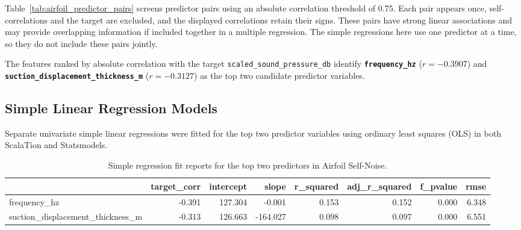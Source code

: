 \documentclass[11pt]{article}
\begin{document}
Table~\ref{tab:airfoil_predictor_pairs} screens predictor pairs using an absolute correlation threshold of 0.75. Each pair appears once, self-correlations and the target are excluded, and the displayed correlations retain their signs. These pairs have strong linear associations and may provide overlapping information if included together in a multiple regression. The simple regressions here use one predictor at a time, so they do not include these pairs jointly.

The features ranked by absolute correlation with the target \texttt{scaled\_sound\_pressure\_db} identify \textbf{\texttt{frequency\_hz}} ($r = -0.3907$) and \textbf{\texttt{suction\_displacement\_thickness\_m}} ($r = -0.3127$) as the top two candidate predictor variables.

\subsection{Simple Linear Regression Models}
Separate univariate simple linear regressions were fitted for the top two predictor variables using ordinary least squares (OLS) in both ScalaTion and Statsmodels.

\begin{table}[H]
\centering
\small
\begin{tabular}{lrrrrrrr}
\toprule
 & target\_corr & intercept & slope & r\_squared & adj\_r\_squared & f\_pvalue & rmse \\
\midrule
frequency\_hz & -0.391 & 127.304 & -0.001 & 0.153 & 0.152 & 0.000 & 6.348 \\
suction\_displacement\_thickness\_m & -0.313 & 126.663 & -164.027 & 0.098 & 0.097 & 0.000 & 6.551 \\
\bottomrule
\end{tabular}

\caption{Simple regression fit reports for the top two predictors in Airfoil Self-Noise.}
\label{tab:airfoil_reg}
\end{table}
\end{document}
